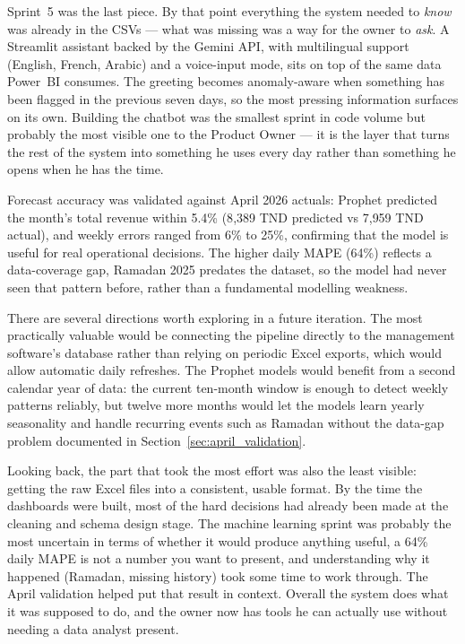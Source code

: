 \documentclass[12pt, a4paper]{report}
\begin{document}
Sprint~5 was the last piece. By that point everything the system needed to
\emph{know} was already in the CSVs --- what was missing was a way for the owner to
\emph{ask}. A Streamlit assistant backed by the Gemini API, with multilingual
support (English, French, Arabic) and a voice-input mode, sits on top of the same
data Power~BI consumes. The greeting becomes anomaly-aware when something has been
flagged in the previous seven days, so the most pressing information surfaces on
its own. Building the chatbot was the smallest sprint in code volume but probably
the most visible one to the Product Owner --- it is the layer that turns the rest
of the system into something he uses every day rather than something he opens
when he has the time.

Forecast accuracy was validated against April 2026 actuals: Prophet predicted the
month's total revenue within 5.4\% (8{,}389 TND predicted vs 7{,}959 TND actual),
and weekly errors ranged from 6\% to 25\%, confirming that the model is useful for
real operational decisions. The higher daily MAPE (64\%) reflects a data-coverage
gap, Ramadan 2025 predates the dataset, so the model had never seen that pattern
before, rather than a fundamental modelling weakness.

There are several directions worth exploring in a future iteration. The most
practically valuable would be connecting the pipeline directly to the management
software's database rather than relying on periodic Excel exports, which would allow
automatic daily refreshes. The Prophet models would benefit from a second calendar
year of data: the current ten-month window is enough to detect weekly patterns
reliably, but twelve more months would let the models learn yearly seasonality and
handle recurring events such as Ramadan without the data-gap problem documented in
Section~\ref{sec:april_validation}.

Looking back, the part that took the most effort was also the least visible:
getting the raw Excel files into a consistent, usable format. By the time the
dashboards were built, most of the hard decisions had already been made at the
cleaning and schema design stage. The machine learning sprint was probably
the most uncertain in terms of whether it would produce anything useful,
a 64\% daily MAPE is not a number you want to present, and understanding why
it happened (Ramadan, missing history) took some time to work through. The April
validation helped put that result in context. Overall the system does what it was
supposed to do, and the owner now has tools he can actually use without needing
a data analyst present.
\end{document}
